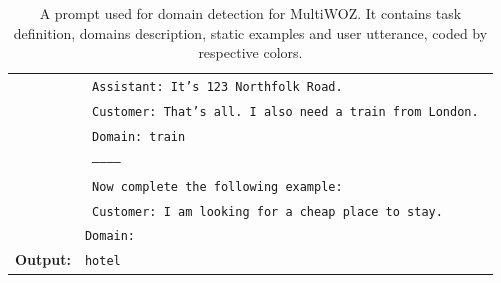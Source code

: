 \begin{table}[tp]
\begin{tabular}{rl}
&\texttt{{\color{red!50!yellow!90!black!100!} Assistant: It's 123 Northfolk Road. }} \\
& \texttt{ {\color{red!50!yellow!90!black!100!} Customer: That's all. I also need a train from London. }} \\
&  \texttt{{\color{red!50!yellow!90!black!100!} Domain: train }}\\
& \texttt{{\color{red!50!yellow!90!black!100!} ----------- }} \\
& \texttt{{\color{cyan!80!yellow!80!black!100 } Now complete the following example:}} \\
& \texttt{{\color{orange!50!yellow!90!black!100!} Customer: I am looking for a cheap place to stay. }}\\
& \texttt{Domain:} \\
      \midrule
      \textbf{Output:} & \texttt{hotel} \\
      \bottomrule
  \end{tabular}
    \caption{A prompt used for domain detection for MultiWOZ.
  It contains {\color{cyan!80!yellow!80!black!100} task definition},  {\color{green!100!yellow!70!black!100!}domains description}, {\color{red!50!yellow!90!black!100!} static examples} and {\color{orange!50!yellow!90!black!100!} user utterance}, coded by respective colors.}
  \label{07_tab:domain}
\end{table}

